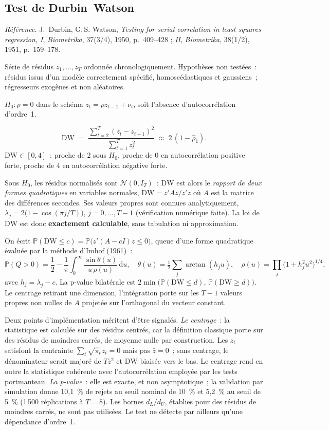 \documentclass[a4paper,11pt]{article}
\newcommand{\refl}[1]{{\small\textcolor{maincolor!70!black}{\textit{Référence.} #1}}\par\smallskip}
\newcounter{ficheid}
\newenvironment{fiche}[1]{%
  \stepcounter{ficheid}%
  \phantomsection
  \subsection{#1}%
  \label{fiche:\theficheid}%
}{%
  \end{description}\vspace{0.5em}%
}
\newcommand{\Cadre}{%
  \begin{description}[leftmargin=0pt, style=unboxed, itemsep=3pt, topsep=3pt, parsep=2pt]%
  \item[\textcolor{financeblue}{\textbf{1. Cadre, notations et hypothèses de validité (non testées).}}]}
\newcommand{\Hzero}{\item[\textcolor{financeblue}{\textbf{2. Hypothèse nulle.}}]}
\newcommand{\Stat}{\item[\textcolor{financeblue}{\textbf{3. Statistique de test.}}]}
\newcommand{\Loi}{\item[\textcolor{financeblue}{\textbf{4. Loi sous $H_0$.}}]}
\newcommand{\Pval}{\item[\textcolor{financeblue}{\textbf{5. p-value.}}]}
\newcommand{\Usage}{\item[\textcolor{financeblue}{\textbf{6. Usage et limites.}}]}
\begin{document}
\begin{fiche}{Test de Durbin--Watson}
\refl{J.~Durbin, G.\,S. Watson, \emph{Testing for serial correlation in least squares regression,
I}, \emph{Biometrika}, 37(3/4), 1950, p.~409--428 ; \emph{II}, \emph{Biometrika}, 38(1/2), 1951,
p.~159--178.}
\Cadre
Série de résidus $z_1,\dots,z_T$ ordonnée chronologiquement. Hypothèses non testées~: résidus
issus d'un modèle correctement spécifié, homoscédastiques et gaussiens~; régresseurs exogènes et
non aléatoires.
\Hzero
$H_0 : \rho = 0$ dans le schéma $z_t = \rho z_{t-1} + \nu_t$, soit l'absence d'autocorrélation
d'ordre~1.
\Stat
\[
  \mathrm{DW} \;=\; \frac{\sum_{t=2}^{T}(z_t - z_{t-1})^2}{\sum_{t=1}^{T} z_t^2}
  \;\approx\; 2\,(1 - \hat\rho_1).
\]
$\mathrm{DW} \in [0,4]$~: proche de 2 sous $H_0$, proche de 0 en autocorrélation positive forte,
proche de 4 en autocorrélation négative forte.
\Loi
Sous $H_0$, les résidus normalisés sont $\mathcal{N}(0, I_T)$~: $\mathrm{DW}$ est alors le
\emph{rapport de deux formes quadratiques} en variables normales,
$\mathrm{DW} = z'Az / z'z$ où $A$ est la matrice des différences secondes. Ses valeurs propres
sont connues analytiquement, $\lambda_j = 2\big(1 - \cos(\pi j / T)\big)$, $j = 0,\dots,T-1$
(vérification numérique faite). La loi de $\mathrm{DW}$ est donc \textbf{exactement calculable},
sans tabulation ni approximation.
\Pval
On écrit $\mathbb{P}(\mathrm{DW} \le c) = \mathbb{P}\big(z'(A - cI)z \le 0\big)$, queue d'une
forme quadratique évaluée par la méthode d'Imhof (1961)~:
\[
  \mathbb{P}(Q > 0) = \frac{1}{2} - \frac{1}{\pi}\int_0^{\infty}
  \frac{\sin\theta(u)}{u\,\rho(u)}\,\mathrm{d}u,
  \quad
  \theta(u) = \tfrac12\sum_j \arctan(h_j u),
  \quad
  \rho(u) = \prod_j \big(1 + h_j^2u^2\big)^{1/4},
\]
avec $h_j = \lambda_j - c$. La p-value bilatérale est
$2\min\big(\mathbb{P}(\mathrm{DW} \le d),\, \mathbb{P}(\mathrm{DW} \ge d)\big)$.
Le centrage retirant une dimension, l'intégration porte sur les $T-1$ valeurs propres non nulles
de $A$ projetée sur l'orthogonal du vecteur constant.
\Usage
Deux points d'implémentation méritent d'être signalés. \emph{Le centrage}~: la statistique est
calculée sur des résidus centrés, car la définition classique porte sur des résidus de moindres
carrés, de moyenne nulle par construction. Les $z_t$ satisfont la contrainte
$\sum_t\sqrt{\hat\pi_t}z_t = 0$ mais pas $\bar z = 0$~; sans centrage, le dénominateur serait
majoré de $T\bar z^2$ et $\mathrm{DW}$ biaisée vers le bas. Le centrage rend en outre la
statistique cohérente avec l'autocorrélation employée par les tests portmanteau.
\emph{La p-value}~: elle est exacte, et non asymptotique~; la validation par simulation donne
10,1~\% de rejets au seuil nominal de 10~\% et 5,2~\% au seuil de 5~\% (1\,500 réplications à
$T = 8$). Les bornes $d_L/d_U$, établies pour des résidus de moindres carrés, ne sont pas
utilisées. Le test ne détecte par ailleurs qu'une dépendance d'ordre~1.
\end{fiche}
\end{document}
